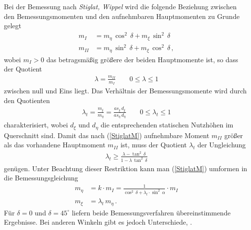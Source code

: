 Bei der Bemessung nach {\em Stiglat, Wippel\/} wird die folgende Beziehung zwischen den Bemessungsmomenten und den aufnehmbaren Hauptmomenten zu Grunde gelegt
\begin{align}\label{StiglatM}
m_I &= m_\eta \,\cos^2\,\delta + m_\xi\,\sin^2\,\delta \\
m_{II} &= m_\eta \,\sin^2\,\delta + m_\xi\,\cos^2\,\delta\,,
\end{align}
wobei $m_I > 0$ das betragsm\"{a}{\ss}ig gr\"{o}{\ss}ere der beiden Hauptmomente ist, so dass der
Quotient
\begin{align}
\lambda = \frac{m_{II}}{m_I} \qquad 0 \leq \lambda \leq 1
\end{align}
zwischen null und Eins liegt. Das Verh\"{a}ltnis der Bemessungsmomente wird durch den
Quotienten
\begin{align}
\lambda_t = \frac{m_\xi}{m_\eta} = \frac{as_\xi\,d_\xi}{as_\eta\,d_\eta} \qquad 0 \leq
\lambda_t \leq 1
\end{align}
charakterisiert, wobei $d_\xi$ und $d_\eta$ die entsprechenden statischen Nutzh\"{o}hen im Querschnitt sind. Damit das nach (\ref{StiglatM}) aufnehmbare Moment $m_{II}$ gr\"{o}{\ss}er als das vorhandene Hauptmoment $m_{II}$ ist, muss der Quotient $\lambda_t$ der Ungleichung
\begin{align}
\lambda_t \geq \frac{\lambda - \tan^2\,\delta}{1 - \lambda\,\tan^2\,\delta}
\end{align}
gen\"{u}gen. Unter Beachtung dieser Restriktion kann man (\ref{StiglatM}) umformen in die
Bemessungsgleichung
\begin{align}
m_\eta &= k \cdot m_I = \frac{1}{\cos^2\,\delta + \lambda_t\cdot \sin^2\,\alpha} \cdot
m_I\\
m_\xi &= \lambda_t\,m_\eta \,.
\end{align}
F\"{u}r $\delta = 0$ und $\delta = 45^\circ$ liefern beide Bemessungsverfahren \"{u}bereinstimmende Ergebnisse. Bei anderen Winkeln gibt es jedoch Unterschiede, \cite{Rombach}.\\






